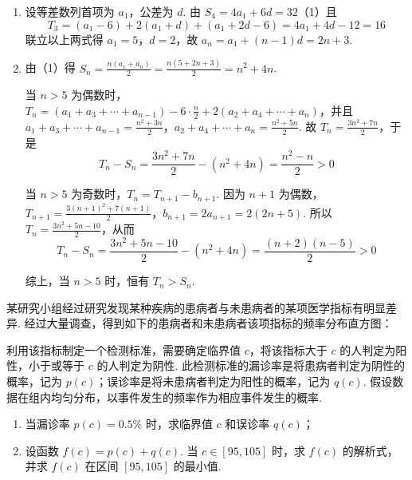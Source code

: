 \begin{solution}
\begin{enumerate}
\item 设等差数列首项为 \(a_1\)，公差为 \(d\). 由 \(S_4=4a_1+6d=32\)（1）且
			\[
			T_3=(a_1-6)+2(a_1+d)+(a_1+2d-6)=4a_1+4d-12=16
			\]
			联立以上两式得 \(a_1=5\)，\(d=2\)，故 \(a_n=a_1+(n-1)d=2n+3\).

\item 由（1）得 \(S_n=\frac{n(a_1+a_n)}{2}=\frac{n(5+2n+3)}{2}=n^2+4n\).

		当 \(n>5\) 为偶数时，\(T_n=(a_1+a_3+\cdots+a_{n-1})-6\cdot\frac n2+2(a_2+a_4+\cdots+a_n)\)，并且 \(a_1+a_3+\cdots+a_{n-1}=\frac{n^2+3n}{2}\)，\(a_2+a_4+\cdots+a_n=\frac{n^2+5n}{2}\).
	故 \(T_n=\frac{3n^2+7n}{2}\)，于是
	\[
	T_n-S_n=\frac{3n^2+7n}{2}-(n^2+4n)=\frac{n^2-n}{2}>0
	\]

		当 \(n>5\) 为奇数时，\(T_n=T_{n+1}-b_{n+1}\). 因为 \(n+1\) 为偶数，\(T_{n+1}=\frac{3(n+1)^2+7(n+1)}{2}\)，\(b_{n+1}=2a_{n+1}=2(2n+5)\).
	所以 \(T_n=\frac{3n^2+5n-10}{2}\)，从而
	\[
	T_n-S_n=\frac{3n^2+5n-10}{2}-(n^2+4n)=\frac{(n+2)(n-5)}{2}>0
	\]

综上，当 \(n>5\) 时，恒有 \(T_n>S_n\).
\end{enumerate}
\end{solution}

\begin{problem}
某研究小组经过研究发现某种疾病的患病者与未患病者的某项医学指标有明显差异. 经过大量调查，得到如下的患病者和未患病者该项指标的频率分布直方图：

利用该指标制定一个检测标准，需要确定临界值 \(c\)，将该指标大于 \(c\) 的人判定为阳性，小于或等于 \(c\) 的人判定为阴性. 此检测标准的漏诊率是将患病者判定为阴性的概率，记为 \(p(c)\)；误诊率是将未患病者判定为阳性的概率，记为 \(q(c)\). 假设数据在组内均匀分布，以事件发生的频率作为相应事件发生的概率.
\begin{enumerate}
\item 当漏诊率 \(p(c)=0.5\%\) 时，求临界值 \(c\) 和误诊率 \(q(c)\)；
\item 设函数 \(f(c)=p(c)+q(c)\). 当 \(c\in[95,105]\) 时，求 \(f(c)\) 的解析式，并求 \(f(c)\) 在区间 \([95,105]\) 的最小值.
\end{enumerate}

\begin{center}
\end{center}
\end{problem}

